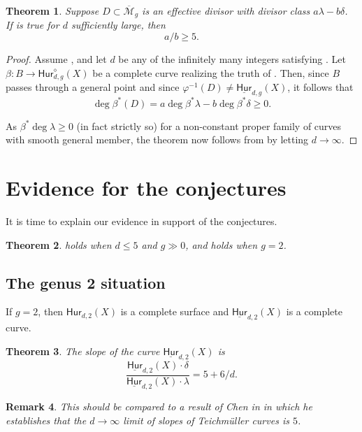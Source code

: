 \documentclass[reqno, 11pt]{amsart}
\newtheorem{theorem}{Theorem}[section]
\newtheorem{remark}[theorem]{Remark}
\newcommand{\HdtwoX}{\mathsf{Hur}_{d,2}(X)}
\newcommand{\Mgbar}{\overline{\mathcal{M}}_{g}}
\newcommand{\Hurfixedtwo}{\underline{\mathsf{Hur}}_{d,2}(X)}
\newcommand{\Hurstable}[2]{\mathsf{Hur}_{#1,#2}^{\diamond}}
\newcommand{\Hurfixed}[2]{\underline{\mathsf{Hur}}_{#1,#2}}
\begin{document}
\begin{theorem}
    \label{theorem:slopeimplication} Suppose $D \subset \Mgbar$ is an effective divisor with divisor class $a \lambda - b \delta$.  If  is true for $d$ sufficiently large, then \[a/b \geq 5.\]
\end{theorem}

\begin{proof}
    Assume , and let $d$ be any of the infinitely many integers satisfying .  Let $\beta: B \to \Hurstable{d}{g}(X)$ be a complete curve realizing the truth of .  Then, since $B$ passes through a general point and since $\varphi^{-1}(D) \neq \Hurfixed{d}{g}(X)$, it follows that \[\deg \beta^{*}(D) = a \deg \beta^{*} \lambda - b \deg \beta^{*} \delta \geq 0.\] 

    As $\beta^{*} \deg \lambda \geq 0$ (in fact strictly so) for a non-constant proper family of curves with smooth general member, the theorem now follows from  by letting $d \to \infty$.
\end{proof}

\section{Evidence for the conjectures} It is time to explain our evidence in support of the conjectures. 

\begin{theorem}
    \label{theorem:evidence}  holds when $d \leq 5$ and $g \gg 0$, and  holds when $g=2$. 
\end{theorem}

\subsection{The genus 2 situation}

If $g=2$, then $\HdtwoX$ is a complete surface and $\Hurfixedtwo$ is a complete curve.

\begin{theorem}
    \label{theorem:genus2} The slope of the curve $\Hurfixedtwo$ is \[\frac{\Hurfixedtwo \cdot \delta}{\Hurfixedtwo \cdot \lambda} = 5+6/d.\]
\end{theorem}

\begin{remark}
    This should be compared to a result of Chen in \cite{chen2011square} in which he establishes that the $d \to \infty$ limit of slopes of Teichm\"uller curves is $5$. 
\end{remark}
\end{document}

